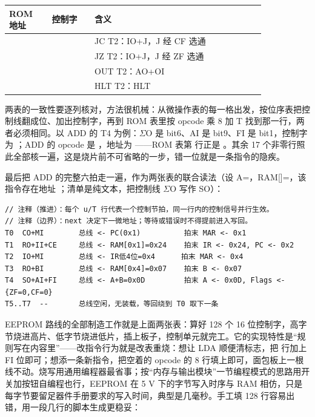 \begin{longtable}{L{0.14\linewidth}L{0.14\linewidth}L{0.56\linewidth}}
\toprule
ROM 地址 & 控制字 & 含义 \\
\midrule
{} &  & JC T2：IO+J，J 经 CF 选通 \\\tablerowrule
{} &  & JZ T2：IO+J，J 经 ZF 选通 \\\tablerowrule
{} &  & OUT T2：AO+OI \\\tablerowrule
{} &  & HLT T2：HLT \\
\bottomrule
\end{longtable}

两表的一致性要逐列核对，方法很机械：从微操作表的每一格出发，按位序表把控制线翻成位、加出控制字，再到 ROM 表里按 opcode 乘 8 加 T 找到那一行，两者必须相同。以 ADD 的 T4 为例：$\Sigma$O 是 bit6、AI 是 bit9、FI 是 bit1，控制字为 ；ADD 的 opcode 是 ，地址为 ——ROM 表第  行正是 。其余 17 个非零行照此全部核一遍，这是烧片前不可省略的一步，错一位就是一条指令的隐疾。

最后把 ADD 的完整六拍走一遍，作为两张表的联合读法（设 A=，RAM[]=，该指令存在地址 ；清单是纯文本，把控制线 $\Sigma$O 写作 SO）：

\begin{lstlisting}
// 注释（推进）：每个 u/T 行代表一个控制节拍，同一行内的控制信号并行生效。
// 注释（边界）：next 决定下一微地址；等待或错误时不得提前进入写回。
T0  CO+MI        总线 <- PC(0x1)          拍末 MAR <- 0x1
T1  RO+II+CE     总线 <- RAM[0x1]=0x24    拍末 IR <- 0x24, PC <- 0x2
T2  IO+MI        总线 <- IR低4位=0x4      拍末 MAR <- 0x4
T3  RO+BI        总线 <- RAM[0x4]=0x07    拍末 B <- 0x07
T4  SO+AI+FI     总线 <- A+B=0x0D         拍末 A <- 0x0D, Flags <- {ZF=0,CF=0}
T5..T7  --       总线空闲，无装载，等回绕到 T0 取下一条
\end{lstlisting}

EEPROM 路线的全部制造工作就是上面两张表：算好 128 个 16 位控制字，高字节烧进高片、低字节烧进低片，插上板子，控制单元就完工。它的实现特性是“规则写在内容里”——改指令行为就是改表重烧：想让 LDA 顺便清标志，把  行加上 FI 位即可；想添一条新指令，把空着的 opcode  的 8 行填上即可，面包板上一根线不动。烧写用通用编程器最省事；按“内存与输出模块”一节编程模式的思路用开关加按钮自编程也行，EEPROM 在 5 V 下的字节写入时序与 RAM 相仿，只是每字节要留足器件手册要求的写入时间，典型是几毫秒。手工填 128 行容易出错，用一段几行的脚本生成更稳妥：

